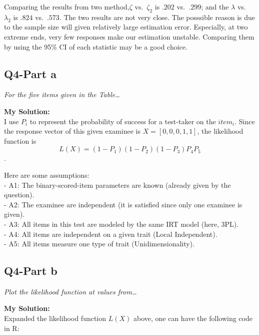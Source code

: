 \documentclass[
]{article}
\begin{document}
Comparing the results from two method,\(\zeta\) vs.~\(\zeta_2\) is
\(.202\) vs.~\(.299\); and the \(\lambda\) vs.~\(\lambda_2\) is \(.824\)
vs.~\(.573\). The two results are not very close. The posssible reason
is due to the sample size will given relatively large estimation error.
Especially, at two extreme ends, very few responses make our estimation
unstable. Comparing them by using the 95\% CI of each statistic may be a
good choice.

\hypertarget{q4-part-a}{%
\subsection{Q4-Part a}\label{q4-part-a}}

\emph{For the five items given in the Table\ldots{}}

\textbf{My Solution: }\\
I use \(P_i\) to represent the probability of success for a test-taker
on the \(item_i\). Since the response vector of this given examinee is
\(X=[0,0,0,1,1]\), the likelihood function is
\[L(X) = (1-P_1)(1-P_2)(1-P_3)P_4P_5\].

Here are some assumptions:\\
- A1: The binary-scored-item parameters are known (already given by the
question).\\
- A2: The examinee are independent (it is satisfied since only one
examinee is given).\\
- A3: All items in this test are modeled by the same IRT model (here,
3PL).\\
- A4: All items are independent on a given trait (Local Independent).\\
- A5: All items measure one type of trait (Unidimensionality).

\hypertarget{q4-part-b}{%
\subsection{Q4-Part b}\label{q4-part-b}}

\emph{Plot the likelihood function at values from\ldots{}}

\textbf{My Solution: }\\
Expanded the likelihood function \(L(X)\) above, one can have the
following code in R:
\end{document}
